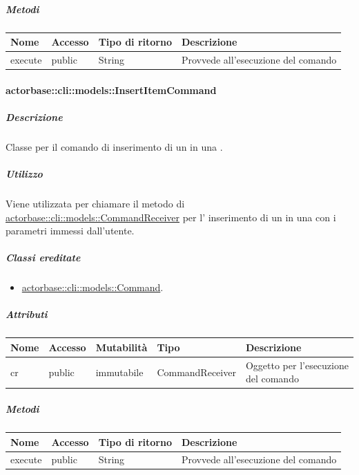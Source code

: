 \documentclass{scalatekids-article}
\begin{document}
\subparagraph{Metodi}

\begin{tabular}{| l | l | l | l |}
  \hline
  Nome & Accesso & Tipo di ritorno & Descrizione\\
  \hline
  execute & public & String & Provvede all'esecuzione del comando\\
  \hline
\end{tabular}

\paragraph{actorbase::cli::models::InsertItemCommand}
\label{sec:actorbase::cli::models::InsertItemCommand}

\subparagraph{Descrizione}

Classe per il comando di inserimento di un  in una
.

\subparagraph{Utilizzo}

Viene utilizzata per chiamare il metodo di \hyperref[sec:actorbase::cli::models::CommandReceiver]{actorbase::cli::models::CommandReceiver} per l' inserimento di un  in una  con i parametri immessi dall'utente.

\subparagraph{Classi ereditate}

\begin{itemize}
\item \hyperref[sec:actorbase::cli::models::Command]{actorbase::cli::models::Command}.
\end{itemize}

\subparagraph{Attributi}

\begin{tabular}{| p{1cm} | p{1.5cm} | p{2cm} | p{4cm} | p{8.5cm} |}
  \hline
  Nome & Accesso & Mutabilità & Tipo & Descrizione\\
  \hline
  cr & public & immutabile & CommandReceiver & Oggetto per l'esecuzione del comando\\
  \hline
\end{tabular}

\subparagraph{Metodi}

\begin{tabular}{| l | l | l | l |}
  \hline
  Nome & Accesso & Tipo di ritorno & Descrizione\\
  \hline
  execute & public & String & Provvede all'esecuzione del comando\\
  \hline
\end{tabular}
\end{document}
